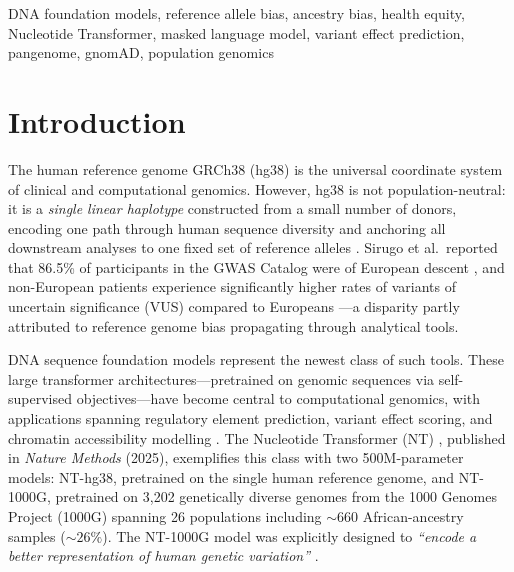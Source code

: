 \documentclass[conference]{IEEEtran}
\begin{document}
\begin{IEEEkeywords}
DNA foundation models, reference allele bias, ancestry bias, health equity,
Nucleotide Transformer, masked language model, variant effect prediction,
pangenome, gnomAD, population genomics
\end{IEEEkeywords}

\section{Introduction}

The human reference genome GRCh38 (hg38) is the universal coordinate system of
clinical and computational genomics. However, hg38 is not population-neutral:
it is a \emph{single linear haplotype} constructed from a small number of donors,
encoding one path through human sequence diversity and anchoring all downstream
analyses to one fixed set of reference alleles \cite{t2t}. Sirugo et al.\ reported that 86.5\% of participants in the GWAS Catalog were
of European descent \cite{diversity_gap}, and non-European patients experience
significantly higher rates of variants of uncertain significance (VUS) compared
to Europeans \cite{vus_burden}---a disparity partly attributed to reference
genome bias propagating through analytical tools.

DNA sequence foundation models represent the newest class of such tools. These
large transformer architectures---pretrained on genomic sequences via
self-supervised objectives---have become central to computational genomics,
with applications spanning regulatory element prediction, variant effect scoring,
and chromatin accessibility modelling \cite{dalla_torre_nt, dart_eval, gpn_benegas}.
The Nucleotide Transformer (NT) \cite{dalla_torre_nt}, published in
\emph{Nature Methods} (2025), exemplifies this class with two 500M-parameter
models: NT-hg38, pretrained on the single human reference genome, and NT-1000G,
pretrained on 3{,}202 genetically diverse genomes from the 1000 Genomes Project
(1000G) spanning 26 populations including ${\sim}660$ African-ancestry samples (${\sim}26\%$).
The NT-1000G model was explicitly designed to \emph{``encode a better
representation of human genetic variation''} \cite{dalla_torre_nt}.
\end{document}
